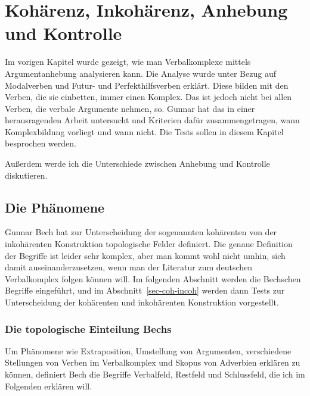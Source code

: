 

\chapter{Kohärenz, Inkohärenz, Anhebung und Kontrolle}
\label{Kapitel-anhebung}

Im vorigen Kapitel wurde gezeigt, wie man Verbalkomplexe mittels
Argumentanhebung analysieren kann. Die Analyse wurde unter Bezug auf
Modalverben und Futur- und Perfekthilfsverben erklärt. Diese bilden
mit den Verben, die sie einbetten, immer einen Komplex.
Das ist jedoch nicht bei allen Verben, die verbale Argumente nehmen,
so. Gunnar \citet{Bech55a} hat das in einer herausragenden
Arbeit untersucht und Kriterien dafür zusammengetragen,
wann Komplexbildung vorliegt und wann nicht. Die Tests sollen
in diesem Kapitel besprochen werden. 

Außerdem werde ich die Unterschiede zwischen Anhebung und Kontrolle diskutieren.

\section{Die Phänomene}


Gunnar Bech hat zur Unterscheidung der sogenannten kohärenten von der inkohärenten
Konstruktion topologische Felder definiert. Die genaue Definition der
Begriffe ist leider sehr komplex, aber man kommt wohl nicht umhin,
sich damit auseinanderzusetzen, wenn man der Literatur zum deutschen
Verbalkomplex folgen können will. Im folgenden Abschnitt werden die Bechschen
Begriffe eingeführt, und im Abschnitt~\ref{sec-coh-incoh} werden dann
Tests zur Unterscheidung der kohärenten und inkohärenten Konstruktion vorgestellt.

\subsection{Die topologische Einteilung Bechs}
\label{topo-bech}

Um Phänomene wie Extraposition, 
Umstellung von Argumenten, verschiedene Stellungen von Verben im Verbalkomplex
und Skopus von Adverbien erklären zu können, 
definiert Bech die Begriffe Verbalfeld, Restfeld und Schlussfeld, %
die ich im Folgenden erklären will.

